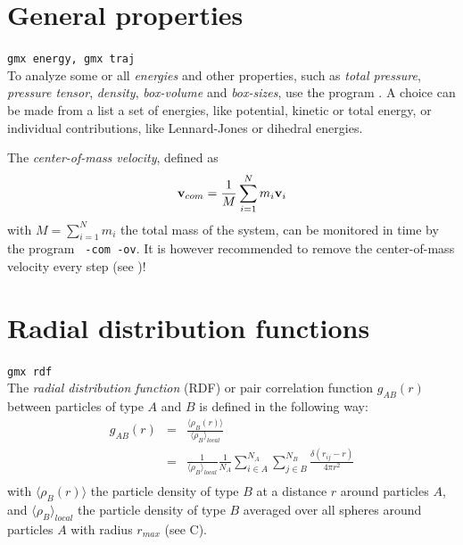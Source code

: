 
\section{General properties}
\label{sec:genprop}
{\tt gmx energy, gmx traj}\\
To analyze some or all {\em energies} and other properties, such as
{\em total pressure}, {\em pressure tensor}, {\em density}, {\em
box-volume} and {\em box-sizes}, use the program {\tt {}}.  A
choice can be made from a list a set of energies, like potential,
kinetic or total energy, or individual contributions, like
Lennard-Jones or dihedral energies.

The {\em center-of-mass velocity}, defined as
\begin{equation}
{\bf v}_{com} = {1 \over M} \sum_{i=1}^N m_i {\bf v}_i
\end{equation}
with $M = \sum_{i=1}^N m_i$ the total mass of the system, can be
monitored in time by the program {\tt {} -com -ov}. It is however
recommended to remove the center-of-mass velocity every step (see
)!


\section{Radial distribution functions}
\label{sec:rdf}
{\tt gmx rdf}\\
The {\em radial distribution function} (RDF) or pair correlation
function $g_{AB}(r)$ between particles of type $A$ and $B$ is defined
in the following way:
\newcommand{\dfrac}[2]{\displaystyle \frac{#1}{#2}}
\begin{equation}
\begin{array}{rcl}
g_{AB}(r)&=&    \dfrac{\langle \rho_B(r) \rangle}{\langle\rho_B\rangle_{local}}         \\
         &=&    \dfrac{1}{\langle\rho_B\rangle_{local}}\dfrac{1}{N_A}
                \sum_{i \in A}^{N_A} \sum_{j \in B}^{N_B} 
                \dfrac{\delta( r_{ij} - r )}{4 \pi r^2}         \\
\end{array}
\end{equation}
with $\langle\rho_B(r)\rangle$ the particle density of type $B$ at a distance $r$
around particles $A$, and $\langle\rho_B\rangle_{local}$ the particle density of
type $B$ averaged over all spheres around particles $A$ with radius
$r_{max}$ (see C).

